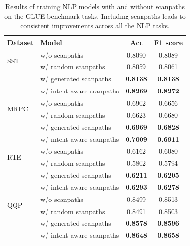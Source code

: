 \begin{table}[!t]
\centering
\begin{tabular}{llcc} 
\toprule
\textbf{Dataset}      & \textbf{Model}         & \textbf{Acc}    & \textbf{F1 score}  \\ 
\midrule
\multirow{2}{*}{SST}  & w/o scanpaths           & 0.8090           & 0.8089             \\
                      & w/ random scanpaths & 0.8059 & 0.8061  \\
                      
                      & w/ generated scanpaths & \textbf{0.8138} & \textbf{0.8138}  \\\cmidrule{2-4}
                      & w/ intent-aware scanpaths & \textbf{0.8269} &	\textbf{0.8272}
                      \\\midrule
\multirow{2}{*}{MRPC} & w/o scanpaths           & 0.6902          & 0.6656             \\
                      & w/ random scanpaths & 0.6623 & 0.6680  \\
                      & w/ generated scanpaths & \textbf{0.6969} & \textbf{0.6828}   \\\cmidrule{2-4}
                      & w/ intent-aware scanpaths & \textbf{0.7009} &	\textbf{0.6911}
                      \\\midrule
\multirow{2}{*}{RTE}  & w/o scanpaths           & 0.6162          & 0.6080              \\
                      & w/ random scanpaths & 0.5802 & 0.5794  \\
                      & w/ generated scanpaths & \textbf{0.6211} & \textbf{0.6205}   \\\cmidrule{2-4}
                      & w/ intent-aware scanpaths & \textbf{0.6293} &	\textbf{0.6278}
                      \\\midrule
\multirow{2}{*}{QQP}  & w/o scanpaths           & 0.8499          & 0.8513              \\
                    & w/ random scanpaths & 0.8491 & 0.8503  \\
                    & w/ generated scanpaths & \textbf{0.8578} & \textbf{0.8596}    \\\cmidrule{2-4}
                      & w/ intent-aware scanpaths & \textbf{0.8648} &	\textbf{0.8658} \\
\bottomrule
\end{tabular}
\caption{Results of training NLP models with and without scanpaths on the GLUE benchmark tasks. Including scanpaths leads to consistent improvements across all the NLP tasks.\label{tab:glue_results}}
\end{table}

